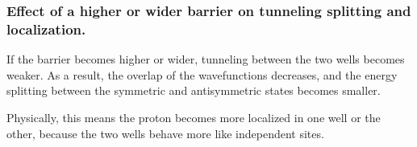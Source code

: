 \documentclass[12pt,a4paper]{article}
\begin{document}
\subsubsection{Effect of a higher or wider barrier on tunneling splitting and localization.}
If the barrier becomes higher or wider, tunneling between the two wells becomes weaker. As a result, the overlap of the wavefunctions decreases, and the energy splitting between the symmetric and antisymmetric states becomes smaller.

Physically, this means the proton becomes more localized in one well or the other, because the two wells behave more like independent sites.

\end{document}
